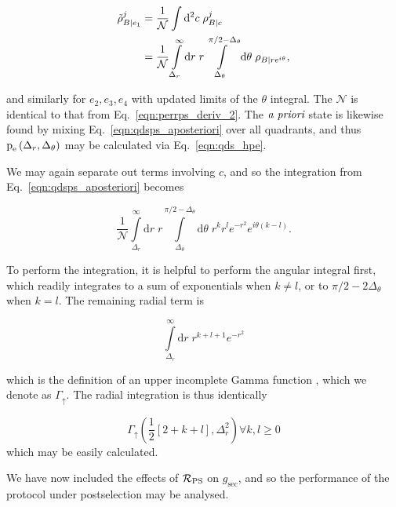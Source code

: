 \begin{align}\label{eqn:qdsps_aposteriori}
\tilde{\rho}_{B | e_1}^j &= \frac{1}{\mathcal{N}} \int \Diff2 c \; \rho_{B | c}^j \notag \\
%
&=\frac{1}{\mathcal{N}} \int\limits_{\Delta_r}^\infty \mathrm{d}r\; r\int\limits_{\Delta_\theta}^{\pi/2 - \Delta_\theta} \mathrm{d}\theta \; \rho_{B | r e^{i \theta}},
\end{align}

\noindent and similarly for $e_2, e_3, e_4$ with updated limits of the $\theta$ integral. The $\mathcal{N}$ is identical to that from Eq.~\ref{eqn:perrps_deriv_2}. The $\emph{a priori}$ state is likewise found by mixing Eq.~\ref{eqn:qdsps_aposteriori} over all quadrants, and thus $\text{p}_{\text{e}}\left(\Delta_r, \Delta_\theta\right)$ may be calculated via Eq.~\ref{eqn:qds_hpe}. 

We may again separate out terms involving $c$, and so the integration from Eq.~\ref{eqn:qdsps_aposteriori} becomes

\begin{equation}
\frac{1}{\mathcal{N}} \int\limits_{\Delta_r}^{\infty} \mathrm{d}r \; r \int\limits_{\Delta_\theta}^{\pi/2 - \Delta_\theta} \mathrm{d}\theta \; r^k r^l e^{-r^2} e^{i \theta \left(k - l\right)}.
\end{equation}

\noindent To perform the integration, it is helpful to perform the angular integral first, which readily integrates to a sum of exponentials when $k \ne l$, or to $\pi/2 - 2\Delta_\theta$ when $k=l$. The remaining radial term is

\begin{equation}
\int\limits_{\Delta_r}^\infty \mathrm{d}r \; r^{k + l + 1} e^{-r^2}
\end{equation}

\noindent which is the definition of an upper incomplete Gamma function , which we denote as $\Gamma_\uparrow$. The radial integration is thus identically

\begin{equation}
\Gamma_{\uparrow}\left(\frac{1}{2}\left[2 + k + l\right], \Delta_r^2\right)  \forall k, l \ge 0
\end{equation}
which may be easily calculated.

We have now included the effects of $\mathcal{R}_{\text{PS}}$ on $g_{\text{sec}}$, and so the performance of the protocol under postselection may be analysed.

